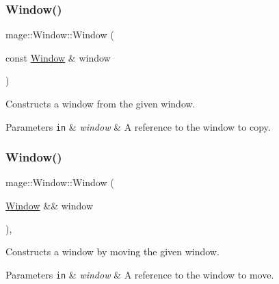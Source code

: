 \subsubsection{\texorpdfstring{Window()}{Window()}\hspace{0.1cm}{\footnotesize\ttfamily [2/3]}}
{\footnotesize\ttfamily mage\+::\+Window\+::\+Window (\begin{DoxyParamCaption}\item[{const \hyperlink{classmage_1_1_window}{Window} \&}]{window }\end{DoxyParamCaption})\hspace{0.3cm}{\ttfamily [delete]}}

Constructs a window from the given window.


\begin{DoxyParams}[1]{Parameters}
\mbox{\tt in}  & {\em window} & A reference to the window to copy. \\
\hline
\end{DoxyParams}
\hypertarget{classmage_1_1_window_a32878487dd2e2f46eaaf97aaf220ee33}{}\label{classmage_1_1_window_a32878487dd2e2f46eaaf97aaf220ee33} 
\subsubsection{\texorpdfstring{Window()}{Window()}\hspace{0.1cm}{\footnotesize\ttfamily [3/3]}}
{\footnotesize\ttfamily mage\+::\+Window\+::\+Window (\begin{DoxyParamCaption}\item[{\hyperlink{classmage_1_1_window}{Window} \&\&}]{window }\end{DoxyParamCaption})\hspace{0.3cm}{\ttfamily [default]}, {\ttfamily [noexcept]}}

Constructs a window by moving the given window.


\begin{DoxyParams}[1]{Parameters}
\mbox{\tt in}  & {\em window} & A reference to the window to move. \\
\hline
\end{DoxyParams}
\hypertarget{classmage_1_1_window_a71d3ce0b3141e89121ae09e8fc64a217}{}\label{classmage_1_1_window_a71d3ce0b3141e89121ae09e8fc64a217} 
